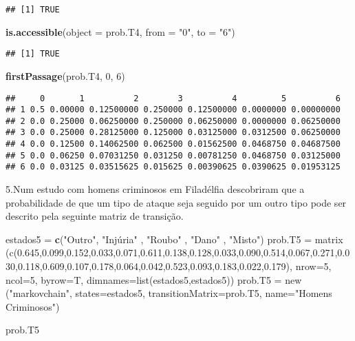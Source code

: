 \documentclass[
]{article}
\newenvironment{Shaded}{\begin{snugshade}}{\end{snugshade}}
\newcommand{\DataTypeTok}[1]{\textcolor[rgb]{0.13,0.29,0.53}{#1}}
\newcommand{\DecValTok}[1]{\textcolor[rgb]{0.00,0.00,0.81}{#1}}
\newcommand{\KeywordTok}[1]{\textcolor[rgb]{0.13,0.29,0.53}{\textbf{#1}}}
\newcommand{\NormalTok}[1]{#1}
\newcommand{\StringTok}[1]{\textcolor[rgb]{0.31,0.60,0.02}{#1}}
\begin{document}
\begin{verbatim}
## [1] TRUE
\end{verbatim}

\begin{Shaded}
\begin{Highlighting}[]
\KeywordTok{is.accessible}\NormalTok{(}\DataTypeTok{object =}\NormalTok{ prob.T4, }\DataTypeTok{from =} \StringTok{"0"}\NormalTok{, }\DataTypeTok{to =} \StringTok{"6"}\NormalTok{)}
\end{Highlighting}
\end{Shaded}

\begin{verbatim}
## [1] TRUE
\end{verbatim}

\begin{Shaded}
\begin{Highlighting}[]
\KeywordTok{firstPassage}\NormalTok{(prob.T4, }\DecValTok{0}\NormalTok{, }\DecValTok{6}\NormalTok{)}
\end{Highlighting}
\end{Shaded}

\begin{verbatim}
##     0       1          2        3          4         5          6
## 1 0.5 0.00000 0.12500000 0.250000 0.12500000 0.0000000 0.00000000
## 2 0.0 0.25000 0.06250000 0.250000 0.06250000 0.0000000 0.06250000
## 3 0.0 0.25000 0.28125000 0.125000 0.03125000 0.0312500 0.06250000
## 4 0.0 0.12500 0.14062500 0.062500 0.01562500 0.0468750 0.04687500
## 5 0.0 0.06250 0.07031250 0.031250 0.00781250 0.0468750 0.03125000
## 6 0.0 0.03125 0.03515625 0.015625 0.00390625 0.0390625 0.01953125
\end{verbatim}

5.Num estudo com homens criminosos em Filadélfia descobriram que a
probabilidade de que um tipo de ataque seja seguido por um outro tipo
pode ser descrito pela seguinte matriz de transição.

\begin{Shaded}
\begin{Highlighting}[]
\NormalTok{estados5 =}\StringTok{ }\KeywordTok{c}\NormalTok{(}\StringTok{"Outro"}\NormalTok{, }\StringTok{"Injúria" , "}\NormalTok{Roubo}\StringTok{" , "}\NormalTok{Dano}\StringTok{" , "}\NormalTok{Misto}\StringTok{")}
\StringTok{prob.T5 = matrix (c(0.645,0.099,0.152,0.033,0.071,0.611,0.138,0.128,0.033,0.090,0.514,0.067,0.271,0.030,0.118,0.609,0.107,0.178,0.064,0.042,0.523,0.093,0.183,0.022,0.179),}
\StringTok{                nrow=5, ncol=5, byrow=T,}
\StringTok{                dimnames=list(estados5,estados5))}
\StringTok{prob.T5 = new ("}\NormalTok{markovchain}\StringTok{", states=estados5, transitionMatrix=prob.T5, name="}\NormalTok{Homens Criminosos}\StringTok{")}

\StringTok{prob.T5}
\end{Highlighting}
\end{Shaded}
\end{document}
